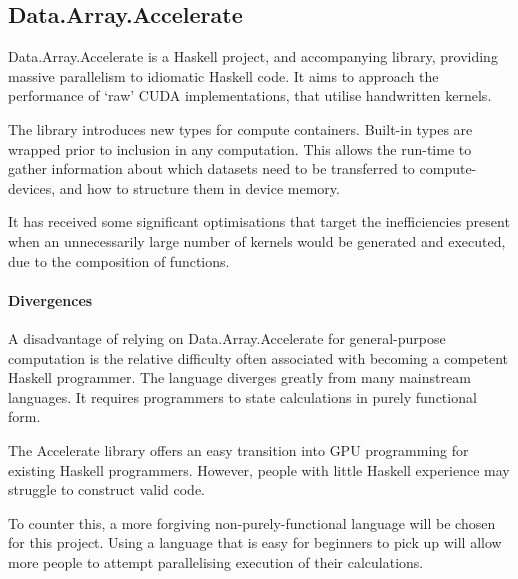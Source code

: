 \subsection{Data.Array.Accelerate}

Data.Array.Accelerate is a Haskell project\cite{daa}, and accompanying library\cite{daalib}, providing massive parallelism to idiomatic Haskell code. It aims to approach the performance of `raw' \ac{CUDA} implementations, that utilise handwritten kernels.

The library introduces new types for compute containers. Built-in types are wrapped prior to inclusion in any computation. This allows the run-time to gather information about which datasets need to be transferred to compute-devices, and how to structure them in device memory.

It has received some significant optimisations\cite{daaopt} that target the inefficiencies present when an unnecessarily large number of kernels would be generated and executed, due to the composition of functions.

\paragraph*{Divergences}
A disadvantage of relying on Data.Array.Accelerate for general-purpose computation is the relative difficulty often associated with becoming a competent Haskell programmer. The language diverges greatly from many mainstream languages.  It requires programmers to state calculations in purely functional form.

The Accelerate library offers an easy transition into \ac{GPU} programming for existing Haskell programmers. However, people with little Haskell experience may struggle to construct valid code.

 To counter this, a more forgiving non-purely-functional language will be chosen for this project. Using a language that is easy for beginners to pick up will allow more people to attempt parallelising execution of their calculations.
